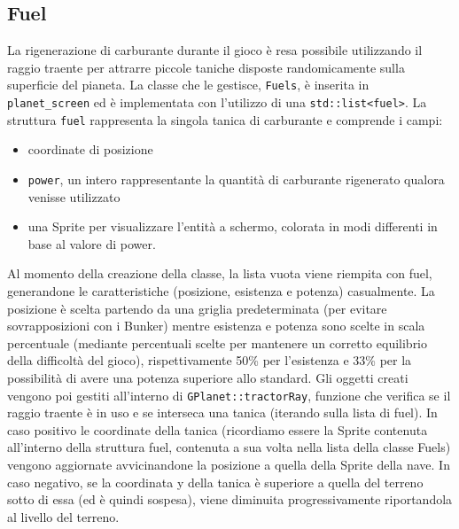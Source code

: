 \documentclass{article}
\begin{document}
\subsection{Fuel}
La rigenerazione di carburante durante il gioco è resa possibile utilizzando il raggio traente per attrarre piccole taniche disposte randomicamente sulla superficie del pianeta.
La classe che le gestisce, \lstinline{Fuels}, è inserita in \lstinline{planet_screen} ed è implementata con l'utilizzo di una \lstinline{std::list<fuel>}.
La struttura \lstinline{fuel} rappresenta la singola tanica di carburante e comprende i campi: 
\begin{itemize}
  \item coordinate di posizione
  \item \lstinline{power}, un intero rappresentante la quantità di carburante rigenerato qualora venisse utilizzato
  \item una Sprite per visualizzare l'entità a schermo, colorata in modi differenti in base al valore di power.
\end{itemize}
Al momento della creazione della classe, la lista vuota viene riempita con fuel, generandone le caratteristiche (posizione, esistenza e potenza) casualmente. La posizione è scelta partendo da una griglia predeterminata (per evitare sovrapposizioni con i Bunker) mentre esistenza e potenza sono scelte in scala percentuale (mediante percentuali scelte per mantenere un corretto equilibrio della difficoltà del gioco), rispettivamente 50\% per l'esistenza e 33\% per la possibilità di avere una potenza superiore allo standard. 
\medskip
\newline
Gli oggetti creati vengono poi gestiti all'interno di \lstinline{GPlanet::tractorRay}, funzione che verifica se il raggio traente è in uso e se interseca una tanica (iterando sulla lista di fuel).
In caso positivo le coordinate della tanica (ricordiamo essere la Sprite contenuta all'interno della struttura fuel, contenuta a sua volta nella lista della classe Fuels) vengono aggiornate avvicinandone la posizione a quella della Sprite della nave. In caso negativo, se la coordinata y della tanica è superiore a quella del terreno sotto di essa (ed è quindi sospesa), viene diminuita progressivamente riportandola al livello del terreno.
\end{document}
